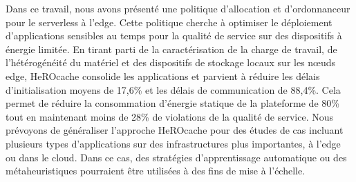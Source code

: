 Dans ce travail, nous avons présenté une politique d'allocation et d'ordonnanceur pour le serverless à l'edge. Cette politique cherche à optimiser le déploiement d'applications sensibles au temps pour la qualité de service sur des dispositifs à énergie limitée. En tirant parti de la caractérisation de la charge de travail, de l'hétérogénéité du matériel et des dispositifs de stockage locaux sur les nœuds edge, HeROcache consolide les applications et parvient à réduire les délais d'initialisation moyens de 17,6\% et les délais de communication de 88,4\%. Cela permet de réduire la consommation d'énergie statique de la plateforme de 80\% tout en maintenant moins de 28\% de violations de la qualité de service. Nous prévoyons de généraliser l'approche HeROcache pour des études de cas incluant plusieurs types d'applications sur des infrastructures plus importantes, à l'edge ou dans le cloud. Dans ce cas, des stratégies d'apprentissage automatique ou des métaheuristiques pourraient être utilisées à des fins de mise à l'échelle.
